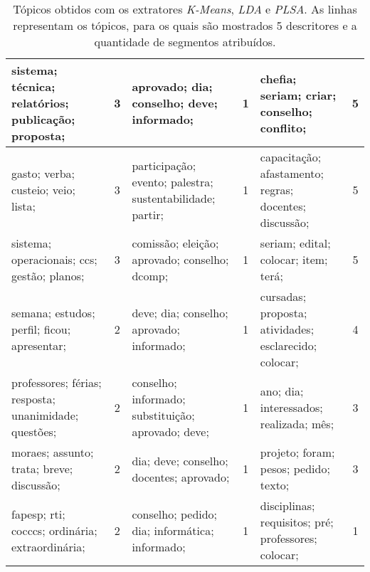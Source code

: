 \begin{table}[!h]
\begin{tabular}{|l|c||l|c||l|c|}
   sistema; técnica; relatórios; publicação; proposta;    &   3  &         aprovado; dia; conselho; deve; informado;    &   1  &       chefia; seriam; criar; conselho; conflito;    &   5  \\ \hline
   gasto; verba; custeio; veio; lista;    &   3  &         participação; evento; palestra; sustentabilidade; partir;    &   1  &       capacitação; afastamento; regras; docentes; discussão;    &   5  \\ \hline
   sistema; operacionais; ccs; gestão; planos;    &   3  &         comissão; eleição; aprovado; conselho; dcomp;    &   1  &       seriam; edital; colocar; item; terá;    &   5  \\ \hline
   semana; estudos; perfil; ficou; apresentar;    &   2  &         deve; dia; conselho; aprovado; informado;    &   1  &       cursadas; proposta; atividades; esclarecido; colocar;    &   4  \\ \hline
   professores; férias; resposta; unanimidade; questões;    &   2  &         conselho; informado; substituição; aprovado; deve;    &   1  &       ano; dia; interessados; realizada; mês;    &   3  \\ \hline
   moraes; assunto; trata; breve; discussão;    &   2  &         dia; deve; conselho; docentes; aprovado;    &   1  &       projeto; foram; pesos; pedido; texto;    &   3  \\ \hline
   fapesp; rti; cocccs; ordinária; extraordinária;    &   2  &         conselho; pedido; dia; informática; informado;    &   1  &       disciplinas; requisitos; pré; professores; colocar;    &   1  \\ \hline










	\end{tabular}
	\caption{Tópicos obtidos com os extratores \textit{K-Means}, \textit{LDA} e \textit{PLSA}. 
As linhas representam os tópicos, para os quais são mostrados 5 descritores e a quantidade de segmentos atribuídos.
}
	\label{tab:resumo-resultados}
\end{table}

